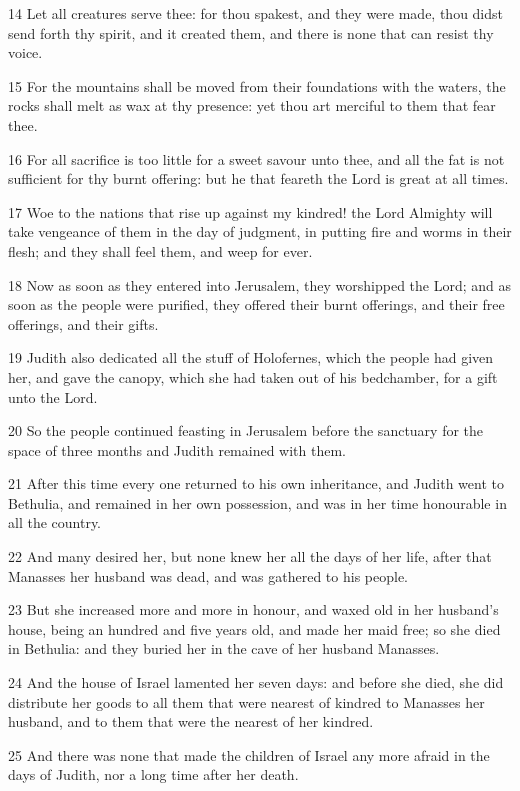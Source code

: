 \par 14 Let all creatures serve thee: for thou spakest, and they were made, thou didst send forth thy spirit, and it created them, and there is none that can resist thy voice.
\par 15 For the mountains shall be moved from their foundations with the waters, the rocks shall melt as wax at thy presence: yet thou art merciful to them that fear thee.
\par 16 For all sacrifice is too little for a sweet savour unto thee, and all the fat is not sufficient for thy burnt offering: but he that feareth the Lord is great at all times.
\par 17 Woe to the nations that rise up against my kindred! the Lord Almighty will take vengeance of them in the day of judgment, in putting fire and worms in their flesh; and they shall feel them, and weep for ever.
\par 18 Now as soon as they entered into Jerusalem, they worshipped the Lord; and as soon as the people were purified, they offered their burnt offerings, and their free offerings, and their gifts.
\par 19 Judith also dedicated all the stuff of Holofernes, which the people had given her, and gave the canopy, which she had taken out of his bedchamber, for a gift unto the Lord.
\par 20 So the people continued feasting in Jerusalem before the sanctuary for the space of three months and Judith remained with them.
\par 21 After this time every one returned to his own inheritance, and Judith went to Bethulia, and remained in her own possession, and was in her time honourable in all the country.
\par 22 And many desired her, but none knew her all the days of her life, after that Manasses her husband was dead, and was gathered to his people.
\par 23 But she increased more and more in honour, and waxed old in her husband's house, being an hundred and five years old, and made her maid free; so she died in Bethulia: and they buried her in the cave of her husband Manasses.
\par 24 And the house of Israel lamented her seven days: and before she died, she did distribute her goods to all them that were nearest of kindred to Manasses her husband, and to them that were the nearest of her kindred.
\par 25 And there was none that made the children of Israel any more afraid in the days of Judith, nor a long time after her death.


